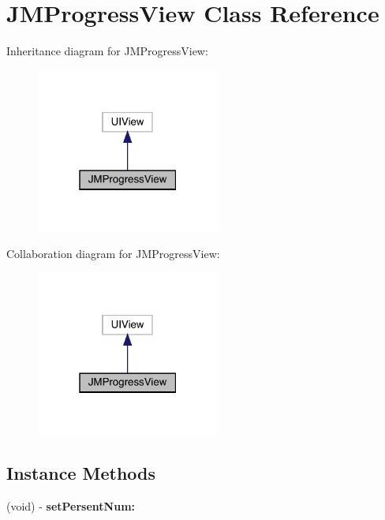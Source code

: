 \hypertarget{interface_j_m_progress_view}{}\section{J\+M\+Progress\+View Class Reference}
\label{interface_j_m_progress_view}


Inheritance diagram for J\+M\+Progress\+View\+:\nopagebreak
\begin{figure}[H]
\begin{center}
\leavevmode
\includegraphics[width=171pt]{interface_j_m_progress_view__inherit__graph}
\end{center}
\end{figure}


Collaboration diagram for J\+M\+Progress\+View\+:\nopagebreak
\begin{figure}[H]
\begin{center}
\leavevmode
\includegraphics[width=171pt]{interface_j_m_progress_view__coll__graph}
\end{center}
\end{figure}
\subsection*{Instance Methods}
\begin{DoxyCompactItemize}
\item 
\mbox{\label{interface_j_m_progress_view_ae2bdb7c6a7e4d762024d92314c0378eb}} 
(void) -\/ {\bfseries set\+Persent\+Num\+:}
\end{DoxyCompactItemize}
